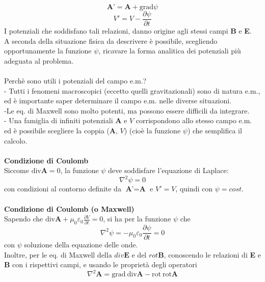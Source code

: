 \documentclass{article}
\begin{document}
\begin{equation}
\textbf{A'}=\textbf{A}+\text{grad}\psi
\nonumber
\end{equation}
\begin{equation}
V'=V-\frac{\partial \psi}{\partial t}
\nonumber
\end{equation}
I potenziali che soddisfano tali relazioni, danno origine agli stessi campi \textbf{B} e \textbf{E}.\\ A seconda della situazione fisica da descrivere è possibile, scegliendo opportunamente la funzione $\psi$, ricavare la forma analitica dei potenziali più adeguata al problema.\\
\\
Perchè sono utili i potenziali del campo e.m.?\\
- Tutti i fenomeni macroscopici (eccetto quelli gravitazionali) sono di natura e.m., ed è importante saper determinare il campo e.m. nelle diverse situazioni.\\
-Le eq. di Maxwell sono molto potenti, ma possono essere difficili da integrare.\\
- Una famiglia di infiniti potenziali \textbf{A} e $V$ corrispondono allo stesso campo e.m. ed è possibile scegliere la coppia (\textbf{A}, $V$) (cioè la
funzione $\psi$) che semplifica il calcolo.\\
\\
\textbf{Condizione di Coulomb}\\
Siccome $\text{div}\textbf{A}=0$, la funzione $\psi$ deve soddisfare l’equazione di Laplace:
\begin{equation}
\nabla^2\psi=0
\nonumber
\end{equation}
con condizioni al contorno definite da $\textbf{A'}=\textbf{A}$ e $V'=V$, quindi con $\psi=cost$.\\
\\
\textbf{Condizione di Coulomb (o Maxwell)}\\
Sapendo che $\text{div}\textbf{A}+\mu_0\varepsilon_0\frac{\partial V}{\partial t}=0$, si ha per la funzione $\psi$ che
\begin{equation}
\nabla^2\psi=-\mu_0\varepsilon_0\frac{\partial \psi}{\partial t}=0
\nonumber
\end{equation}
con $\psi$ soluzione della equazione delle onde.\\
Inoltre, per le eq. di Maxwell della $div\textbf{E}$ e del $rot\textbf{B}$, conoscendo le relazioni di \textbf{E} e \textbf{B} con i rispettivi campi, e usando le proprietà degli operatori
\begin{equation}
\nabla^2\textbf{A}=\text{grad}\ \text{div}\textbf{A}-\text{rot}\ \text{rot}\textbf{A}
\nonumber
\end{equation}
\end{document}
